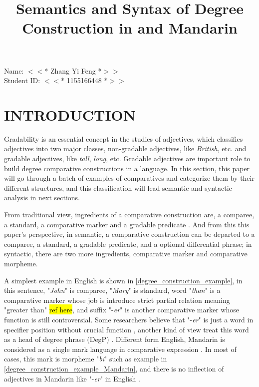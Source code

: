 \documentclass{ctexart}
\title{Semantics and Syntax of Degree Construction in and Mandarin}
\date{\vspace{-10ex}}
\let \cite \parencite
\begin{document}
\thispagestyle{empty} %

\begin{center}

Name: $<<$* Zhang Yi Feng *$>>$ \\
Student ID: $<<$* 1155166448 *$>>$

\end{center}

{\let\newpage\relax\maketitle}


\section{INTRODUCTION}

\setcounter{page}{1}

\noindent
Gradability is an essential concept in the studies of adjectives, which classifies adjectives into two major classes, non-gradable adjectives, like \textit{British}, etc. and gradable adjectives, like \textit{tall}, \textit{long}, etc. Gradable adjectives are important role to build degree comparative constructions in a language. In this section, this paper will go through a batch of examples of comparatives and categorize them by their different structures, and this classification will lead semantic and syntactic analysis in next sections. 

From traditional view, ingredients of a comparative construction are, a comparee, a standard, a comparative marker and a gradable predicate \cite{guo2012}. And from this this paper's perspective, in semantic, a comparative construction can be departed to a comparee, a standard, a gradable predicate, and a optional differential phrase; in syntactic, there are two more ingredients, comparative marker and comparative morpheme.

A simplest example in English is shown in \ref{degree_construction_example}, in this sentence, "\textit{John}" is comparee, "\textit{Mary}" is standard, word "\textit{than}" is a comparative marker whose job is introduce strict partial relation meaning "greater than" \hl{ref here}, and suffix "-\textit{er}" is another comparative marker whose function is still controversial. Some researchers believe that "-\textit{er}" is just a word in specifier position without crucial function \cite{von1984a,heim1985,bhatt2004,rullmann1995}, another kind of view treat this word as a head of degree phrase (DegP) \cite{bierwisch1989,corver1990,corver1993,corver1997a,kennedy1997,grano2012}. Different form English, Mandarin is considered as a single mark language in comparative expression \cite{bobaljik2012,grano2012}. In most of cases, this mark is morpheme "\textit{bi}" such as example in \ref{degree_construction_example_Mandarin}, and there is no inflection of adjectives in Mandarin like "-\textit{er}" in English \cite{guo2012}. 
\end{document}
